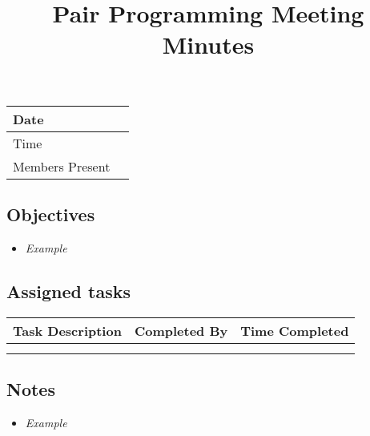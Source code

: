 \documentclass{article}
\title{Pair Programming Meeting Minutes}
\date{}
\begin{document}
    \maketitle
    
    \begin{center}
        \begin{tabular}{ | p{3cm} | p{10cm} |}
        \hline
        Date                & \\ \hline
        Time                & \\ \hline
        Members Present     & \\ \hline
        \end{tabular}
    \end{center}

\subsection{Objectives}
\begin{itemize}
    \item \emph{Example}
\end{itemize}

\subsection{Assigned tasks}
\begin{center}
    \begin{tabular}{ | p{4.5cm} | p{4.5cm} | p{4.5cm} | }
    \hline
    Task Description  & Completed By & Time Completed \\ \hline
                      &              &                \\ \hline
                      &              &                \\ \hline   
    \end{tabular}
\end{center}

\subsection{Notes}

\begin{itemize}
    \item \emph{Example}
\end{itemize}
\end{document}
